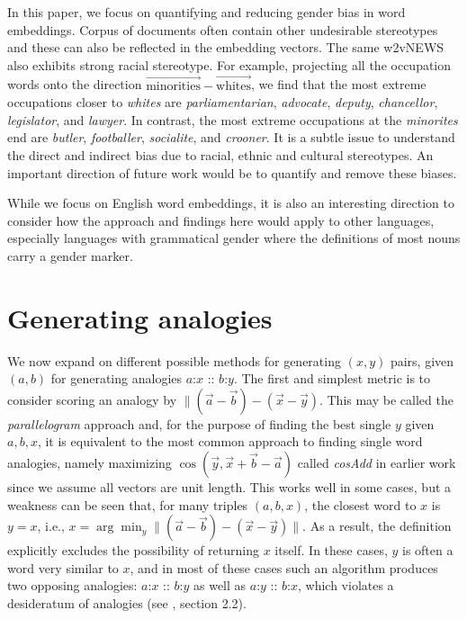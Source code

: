 \documentclass{article}
\newcommand{\wvec}[1]{\overrightarrow{\text{#1}}}
\begin{document}
In this paper, we focus on quantifying and reducing gender bias in word embeddings. Corpus of documents often contain other undesirable stereotypes and these can also be reflected in the embedding vectors. The same w2vNEWS also exhibits strong racial stereotype. For example, projecting all the occupation words onto the direction $\wvec{minorities} - \wvec{whites}$, we find that the most extreme occupations closer to \emph{whites} are \emph{parliamentarian}, \emph{advocate}, \emph{deputy}, \emph{chancellor}, \emph{legislator}, and \emph{lawyer}. In contrast, the most extreme occupations at the \emph{minorites} end are \emph{butler}, \emph{footballer}, \emph{socialite}, and \emph{crooner}. It is a subtle issue to understand the direct and indirect bias due to racial, ethnic and cultural stereotypes. An important direction of future work would be to quantify and remove these biases.

While we focus on English word embeddings, it is also an interesting direction to consider how the approach and findings here would apply to other languages, especially languages with grammatical gender where the definitions of most nouns carry a gender marker.  




\appendix


\section{Generating analogies}\label{ap:analogies}

We now expand on different possible methods for generating $(x,y)$ pairs, given $(a,b)$ for generating analogies $a$:$x$ :: $b$:$y$. The first and simplest metric is to consider scoring an analogy by $\|(\vec{a}-\vec{b})-(\vec{x}-\vec{y})$. This may be called the {\em parallelogram} approach and, for the purpose of finding the best single $y$ given $a,b,x$, it is equivalent to the most common approach to finding single word analogies, namely maximizing $\cos(\vec{y}, \vec{x}+\vec{b}-\vec{a})$ called {\em cosAdd} in earlier work \cite{mikolov2013linguistic} since we assume all vectors are unit length. This works well in some cases, but a weakness can be seen that, for many triples $(a,b,x)$, the closest word to $x$ is $y=x$, i.e., $x = \arg\min_{y} \|(\vec{a}-\vec{b})-(\vec{x}-\vec{y})\|$. As a result, the definition explicitly excludes the possibility of returning $x$ itself. In these cases, $y$ is often a word very similar to $x$, and in most of these cases such an algorithm produces two opposing analogies: $a$:$x$ :: $b$:$y$ as well as $a$:$y$ :: $b$:$x$, which violates a desideratum of analogies (see \cite{turney2012domain}, section 2.2).  
\end{document}
